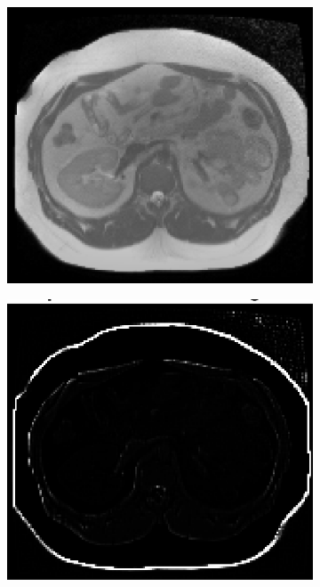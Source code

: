 \documentclass[10pt,twoside]{book}
\begin{document}
\begin{figure}
  \centering
  \begin{subfigure}{0.31\textwidth}
    \centering
    \includegraphics[width=\textwidth]{scenario4_testAutoseg_image}
    \caption{}
    \label{fig:CNN_output_a}
  \end{subfigure}
  \begin{subfigure}{0.31\textwidth}
    \centering
    \includegraphics[width=\textwidth]{scenario4_training_testPosteriorImage}

\end{subfigure}
\end{figure}
\end{document}
